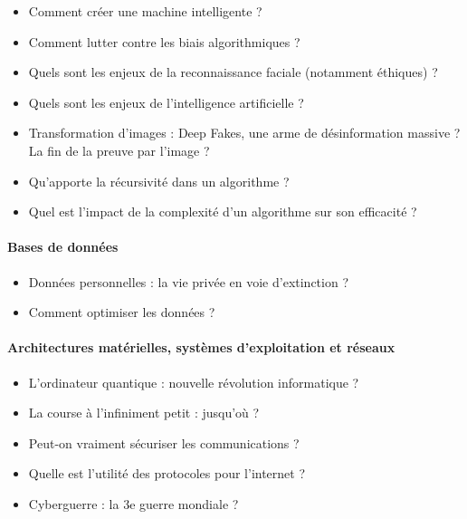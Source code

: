 \documentclass[
  a4paper,
  DIV=11,
  numbers=noendperiod]{scrartcl}
\let\oldparagraph\paragraph
\renewcommand{\paragraph}[1]{\oldparagraph{#1}\mbox{}}
\providecommand{\tightlist}{%
  \setlength{\itemsep}{0pt}\setlength{\parskip}{0pt}}\usepackage{longtable,booktabs,array}
\begin{document}
\begin{itemize}
\tightlist
\item
  Comment créer une machine intelligente ?
\item
  Comment lutter contre les biais algorithmiques ?
\item
  Quels sont les enjeux de la reconnaissance faciale (notamment
  éthiques) ?
\item
  Quels sont les enjeux de l'intelligence artificielle ?
\item
  Transformation d'images : Deep Fakes, une arme de désinformation
  massive ? La fin de la preuve par l'image ?
\item
  Qu'apporte la récursivité dans un algorithme ?
\item
  Quel est l'impact de la complexité d'un algorithme sur son efficacité
  ?
\end{itemize}

\hypertarget{bases-de-donnuxe9es}{%
\paragraph{Bases de données}\label{bases-de-donnuxe9es}}

\begin{itemize}
\tightlist
\item
  Données personnelles : la vie privée en voie d'extinction ?
\item
  Comment optimiser les données ?
\end{itemize}

\hypertarget{architectures-matuxe9rielles-systuxe8mes-dexploitation-et-ruxe9seaux}{%
\paragraph{Architectures matérielles, systèmes d'exploitation et
réseaux}\label{architectures-matuxe9rielles-systuxe8mes-dexploitation-et-ruxe9seaux}}

\begin{itemize}
\tightlist
\item
  L'ordinateur quantique : nouvelle révolution informatique ?
\item
  La course à l'infiniment petit : jusqu'où ?
\item
  Peut-on vraiment sécuriser les communications ?
\item
  Quelle est l'utilité des protocoles pour l'internet ?
\item
  Cyberguerre : la 3e guerre mondiale ?
\end{itemize}
\end{document}
